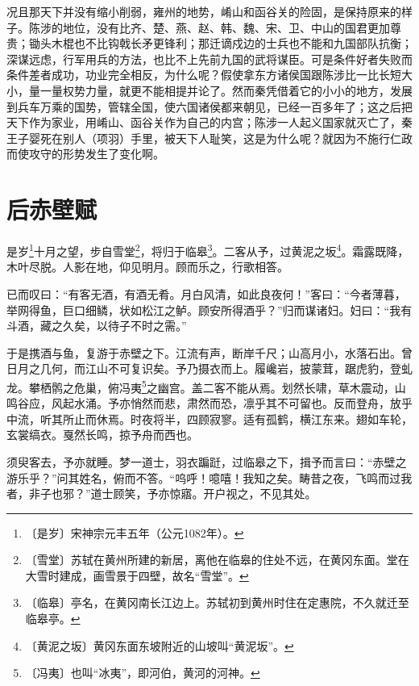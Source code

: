 \documentclass[12pt,UTF-8,openany,a4]{ctexbook}
\begin{document}
\begin{large}
    况且那天下并没有缩小削弱，雍州的地势，崤山和函谷关的险固，是保持原来的样子。陈涉的地位，没有比齐、楚、燕、赵、韩、魏、宋、卫、中山的国君更加尊贵；锄头木棍也不比钩戟长矛更锋利；那迁谪戍边的士兵也不能和九国部队抗衡；深谋远虑，行军用兵的方法，也比不上先前九国的武将谋臣。可是条件好者失败而条件差者成功，功业完全相反，为什么呢？假使拿东方诸侯国跟陈涉比一比长短大小，量一量权势力量，就更不能相提并论了。然而秦凭借着它的小小的地方，发展到兵车万乘的国势，管辖全国，使六国诸侯都来朝见，已经一百多年了；这之后把天下作为家业，用崤山、函谷关作为自己的内宫；陈涉一人起义国家就灭亡了，秦王子婴死在别人（项羽）手里，被天下人耻笑，这是为什么呢？就因为不施行仁政而使攻守的形势发生了变化啊。
    
\end{large}



\chapter{后赤壁赋}

\begin{large}
    
    是岁\footnote{〔是岁〕\yiwen 宋神宗元丰五年（公元1082年）。}十月之望，步自雪堂\footnote{〔雪堂〕\yiwen 苏轼在黄州所建的新居，离他在临皋的住处不远，在黄冈东面。堂在大雪时建成，画雪景于四壁，故名“雪堂”。}，将归于临皋\footnote{〔临皋〕\yiwen 亭名，在黄冈南长江边上。苏轼初到黄州时住在定惠院，不久就迁至临皋亭。}。二客从予，过黄泥之坂\footnote{〔黄泥之坂〕\yiwen 黄冈东面东坡附近的山坡叫“黄泥坂”。}。霜露既降，木叶尽脱。人影在地，仰见明月。顾而乐之，行歌相答。
    
    已而叹曰：“有客无酒，有酒无肴。月白风清，如此良夜何！”客曰：“今者薄暮，举网得鱼，巨口细鳞，状如松江之鲈。顾安所得酒乎？”归而谋诸妇。妇曰：“我有斗酒，藏之久矣，以待子不时之需。”
    
    于是携酒与鱼，复游于赤壁之下。江流有声，断岸千尺；山高月小，水落石出。曾日月之几何，而江山不可复识矣。予乃摄衣而上。履巉岩，披蒙茸，踞虎豹，登虬龙。攀栖鹘之危巢，俯冯夷\footnote{〔冯夷〕\yiwen 也叫“冰夷”，即河伯，黄河的河神。}之幽宫。盖二客不能从焉。划然长啸，草木震动，山鸣谷应，风起水涌。予亦悄然而悲，肃然而恐，凛乎其不可留也。反而登舟，放乎中流，听其所止而休焉。时夜将半，四顾寂寥。适有孤鹤，横江东来。翅如车轮，玄裳缟衣。戛然长鸣，掠予舟而西也。
    
    须臾客去，予亦就睡。梦一道士，羽衣蹁跹，过临皋之下，揖予而言曰：“赤壁之游乐乎？”问其姓名，俯而不答。“呜呼！噫嘻！我知之矣。畴昔之夜，飞鸣而过我者，非子也邪？”道士顾笑，予亦惊寤。开户视之，不见其处。
\end{large}
\end{document}
